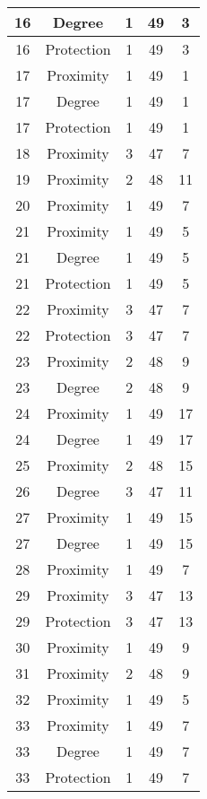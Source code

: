 \documentclass[results.tex]{subfiles}
\begin{document}
\begin{center}
\begin{tabular}{| c || c | c | c | c |}
    \hline
    16 & Degree & 1 & 49 & 3 \\ 
    \hline
    16 & Protection & 1 & 49 & 3 \\ 
    \hline
    17 & Proximity & 1 & 49 & 1 \\ 
    \hline
    17 & Degree & 1 & 49 & 1 \\ 
    \hline
    17 & Protection & 1 & 49 & 1 \\ 
    \hline
    18 & Proximity & 3 & 47 & 7 \\ 
    \hline
    19 & Proximity & 2 & 48 & 11 \\ 
    \hline
    20 & Proximity & 1 & 49 & 7 \\ 
    \hline
    21 & Proximity & 1 & 49 & 5 \\ 
    \hline
    21 & Degree & 1 & 49 & 5 \\ 
    \hline
    21 & Protection & 1 & 49 & 5 \\ 
    \hline
    22 & Proximity & 3 & 47 & 7 \\ 
    \hline
    22 & Protection & 3 & 47 & 7 \\ 
    \hline
    23 & Proximity & 2 & 48 & 9 \\ 
    \hline
    23 & Degree & 2 & 48 & 9 \\ 
    \hline
    24 & Proximity & 1 & 49 & 17 \\ 
    \hline
    24 & Degree & 1 & 49 & 17 \\ 
    \hline
    25 & Proximity & 2 & 48 & 15 \\ 
    \hline
    26 & Degree & 3 & 47 & 11 \\ 
    \hline
    27 & Proximity & 1 & 49 & 15 \\ 
    \hline
    27 & Degree & 1 & 49 & 15 \\ 
    \hline
    28 & Proximity & 1 & 49 & 7 \\ 
    \hline
    29 & Proximity & 3 & 47 & 13 \\ 
    \hline
    29 & Protection & 3 & 47 & 13 \\ 
    \hline
    30 & Proximity & 1 & 49 & 9 \\ 
    \hline
    31 & Proximity & 2 & 48 & 9 \\ 
    \hline
    32 & Proximity & 1 & 49 & 5 \\ 
    \hline
    33 & Proximity & 1 & 49 & 7 \\ 
    \hline
    33 & Degree & 1 & 49 & 7 \\ 
    \hline
    33 & Protection & 1 & 49 & 7 \\ 

\end{tabular}
\end{center}
\end{document}

